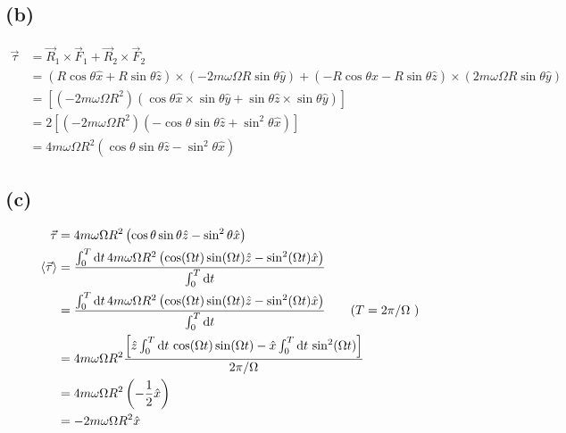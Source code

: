 \documentclass[letter, 10pts]{article}
\begin{document}
\subsection*{(b)} 
\begin{align*}
\vec{\tau} &= 
\vec{R}_1 \times \vec{F}_1 + \vec{R}_2 \times  \vec{F}_2  
\\
&= 
\left(
R \cos \theta \hat{x} + R \sin \theta \hat{z}
\right) \times  (- 2m \omega \Omega R \sin \theta \hat{y})
+ \left(
 -R \cos \theta \hat{x} - R \sin \theta \hat{z}
\right) \times  (2m \omega \Omega R \sin \theta \hat{y})
\\
&= 
\left[
	(-2 m \omega \Omega R^2 ) \left(\cos \theta \hat{x} \times \sin \theta \hat{y} + \sin \theta \hat{z} \times  \sin \theta \hat{y}\right)
\right]
\\
&= 
2 \left[
	(-2 m \omega \Omega R^2 ) \left(- \cos \theta \sin \theta \hat{z}   + \sin ^2 \theta \hat{x}\right)
\right] \\  
&= 
	4 m \omega \Omega R^2  \left(\cos \theta \sin \theta \hat{z}   - \sin ^2 \theta \hat{x}\right)
\end{align*}













\subsection*{(c)} 
\begin{align*}
	\vec{\tau} &= 4 m \omega \Omega R^2 \left(\cos \theta\sin \theta \hat{z} - \sin ^2 \theta \hat{x} \right) \\
	\braket{ \vec{\tau}} 
		   &= \frac{\int_{0}^{T} \mathrm{d} t \,  4 m \omega \Omega R^2 
		   \left(\cos (\Omega t) \sin (\Omega t) \hat{z} - \sin ^2 (\Omega t) \hat{x} \right)}{\int_{0}^{T } \mathrm{d} t }  \\ 
		   &= \frac{\int_{0}^{T} \mathrm{d} t \,  4 m \omega \Omega R^2 
		   \left(\cos (\Omega t) \sin (\Omega t) \hat{z} - \sin ^2 (\Omega t) \hat{x} \right)}{\int_{0}^{T } \mathrm{d} t } 
		   \tag{$T = 2 \pi / \Omega$ } \\ 
&= 
{4 m \omega \Omega R^2} 
\frac{\left[ \hat{z}
\int_{0}^{T} \mathrm{d} t \, \cos(\Omega t) \sin(\Omega t)  - 
\hat{x} \int_{0}^{T} \mathrm{d} t \, \sin ^2 (\Omega t)  
\right]}{2 \pi / \Omega} 
\\
&= 
4 m \omega \Omega R^2 \left(
- \frac{1}{2} \hat{x}
\right)
\\
&= 
-2 m \omega \Omega R^2 
\hat{x}
\\
\end{align*}
\end{document}
